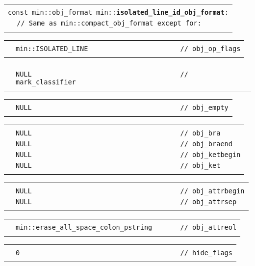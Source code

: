 \documentclass[12pt]{article}
\makeatletter
\newcommand{\TT}[1]{{\tt \bfseries #1}}
\newcommand{\ttindex}[1]{\index{#1@{\tt #1}}}
\newenvironment{indpar}[1][0.3in]%
	{\begin{list}{}%
		     {\setlength{\itemsep}{0in}%
		      \setlength{\topsep}{0in}%
		      \setlength{\parsep}{1ex}%
		      \setlength{\labelwidth}{#1}%
		      \setlength{\leftmargin}{#1}%
		      \addtolength{\leftmargin}{\labelsep}}%
	 \item}%
	{\end{list}}
\newcommand{\LABEL}[1]{\label{#1}}
\newlength{\ARGBREAKLENGTH}
\newcommand{\ARGBREAK}[1][\ARGBREAKLENGTH]{\\&\hspace*{#1}}
\newcommand{\MINKEY}[1]%
	   {\TT{#1}\ttindex{min::#1}\ttindex{#1}}
\makeatother
\begin{document}
\begin{indpar}[1em]

\begin{tabular}{r@{}l}\hspace*{0.1in} \\[-3ex]
\multicolumn{2}{l}{\tt const min::obj\_format
                   min::\MINKEY{isolated\_line\_id\_obj\_format}:}%
\LABEL{MIN::ISOLATED_LINE_ID_OBJ_FORMAT}\ARGBREAK
\verb|// Same as min::compact_obj_format except for:|\ARGBREAK
\end{tabular}

\vspace{-4ex}\begin{tabular}{r@{}l}\hspace*{0.1in}\ARGBREAK
\verb|min::ISOLATED_LINE                       // obj_op_flags|\ARGBREAK
\end{tabular}

\vspace{-4ex}\begin{tabular}{r@{}l}\hspace*{0.1in}\ARGBREAK
\verb|NULL                                     // mark_classifier|\ARGBREAK
\end{tabular}

\vspace{-4ex}\begin{tabular}{r@{}l}\hspace*{0.1in}\ARGBREAK
\verb|NULL                                     // obj_empty|\ARGBREAK
\end{tabular}

\vspace{-4ex}\begin{tabular}{r@{}l}\hspace*{0.1in}\ARGBREAK
\verb|NULL                                     // obj_bra|\ARGBREAK
\verb|NULL                                     // obj_braend|\ARGBREAK
\verb|NULL                                     // obj_ketbegin|\ARGBREAK
\verb|NULL                                     // obj_ket|\ARGBREAK
\end{tabular}

\vspace{-4ex}\begin{tabular}{r@{}l}\hspace*{0.1in}\ARGBREAK
\verb|NULL                                     // obj_attrbegin|\ARGBREAK
\verb|NULL                                     // obj_attrsep|\ARGBREAK
\end{tabular}

\vspace{-4ex}\begin{tabular}{r@{}l}\hspace*{0.1in}\ARGBREAK
\verb|min::erase_all_space_colon_pstring       // obj_attreol|\ARGBREAK
\end{tabular}

\vspace{-4ex}\begin{tabular}{r@{}l}\hspace*{0.1in}\ARGBREAK
\verb|0                                        // hide_flags|\ARGBREAK
\end{tabular}

\end{indpar}
\end{document}

